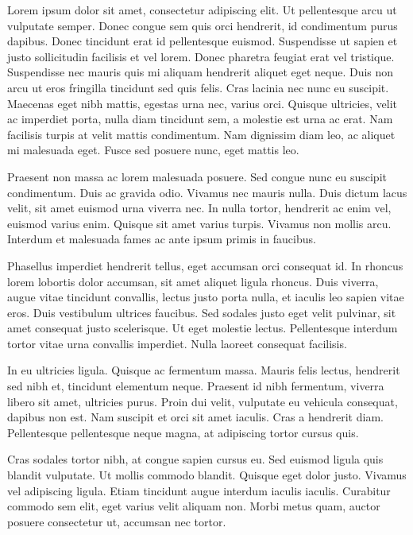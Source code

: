 Lorem ipsum dolor sit amet, consectetur adipiscing elit. Ut
pellentesque arcu ut vulputate semper. Donec congue sem quis orci
hendrerit, id condimentum purus dapibus. Donec tincidunt erat id
pellentesque euismod. Suspendisse ut sapien et justo sollicitudin
facilisis et vel lorem. Donec pharetra feugiat erat vel
tristique. Suspendisse nec mauris quis mi aliquam hendrerit aliquet
eget neque. Duis non arcu ut eros fringilla tincidunt sed quis
felis. Cras lacinia nec nunc eu suscipit. Maecenas eget nibh mattis,
egestas urna nec, varius orci. Quisque ultricies, velit ac imperdiet
porta, nulla diam tincidunt sem, a molestie est urna ac erat. Nam
facilisis turpis at velit mattis condimentum. Nam dignissim diam leo,
ac aliquet mi malesuada eget. Fusce sed posuere nunc, eget mattis leo.

Praesent non massa ac lorem malesuada posuere. Sed congue nunc eu
suscipit condimentum. Duis ac gravida odio. Vivamus nec mauris
nulla. Duis dictum lacus velit, sit amet euismod urna viverra nec. In
nulla tortor, hendrerit ac enim vel, euismod varius enim. Quisque sit
amet varius turpis. Vivamus non mollis arcu. Interdum et malesuada
fames ac ante ipsum primis in faucibus.

Phasellus imperdiet hendrerit tellus, eget accumsan orci consequat
id. In rhoncus lorem lobortis dolor accumsan, sit amet aliquet ligula
rhoncus. Duis viverra, augue vitae tincidunt convallis, lectus justo
porta nulla, et iaculis leo sapien vitae eros. Duis vestibulum
ultrices faucibus. Sed sodales justo eget velit pulvinar, sit amet
consequat justo scelerisque. Ut eget molestie lectus. Pellentesque
interdum tortor vitae urna convallis imperdiet. Nulla laoreet
consequat facilisis.

In eu ultricies ligula. Quisque ac fermentum massa. Mauris felis
lectus, hendrerit sed nibh et, tincidunt elementum neque. Praesent id
nibh fermentum, viverra libero sit amet, ultricies purus. Proin dui
velit, vulputate eu vehicula consequat, dapibus non est. Nam suscipit
et orci sit amet iaculis. Cras a hendrerit diam. Pellentesque
pellentesque neque magna, at adipiscing tortor cursus quis.

Cras sodales tortor nibh, at congue sapien cursus eu. Sed euismod
ligula quis blandit vulputate. Ut mollis commodo blandit. Quisque eget
dolor justo. Vivamus vel adipiscing ligula. Etiam tincidunt augue
interdum iaculis iaculis. Curabitur commodo sem elit, eget varius
velit aliquam non. Morbi metus quam, auctor posuere consectetur ut,
accumsan nec tortor.

